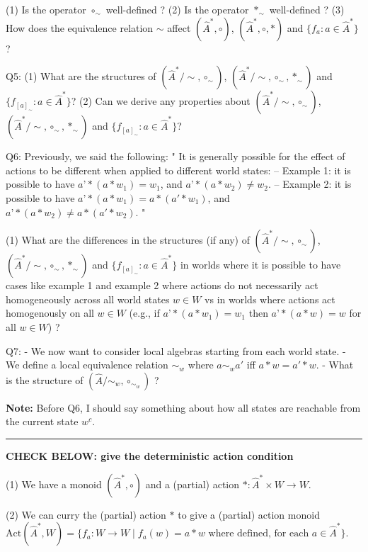 (1) Is the operator $\circ_{\sim}$ well-defined ?
(2) Is the operator $\ast_{\sim}$ well-defined ?
(3) How does the equivalence relation $\sim$ affect $(\hat{A}^{\ast}, \circ)$, $(\hat{A}^{\ast}, \circ, \ast)$ and $\{ f_{a} : a \in \hat{A}^{\ast} \}$ ?

Q5:
(1) What are the structures of $(\hat{A}^{\ast}/\sim, \circ_{\sim})$, $(\hat{A}^{\ast}/\sim, \circ_{\sim}, \ast_{\sim})$ and $\{ f_{[a]_{\sim}} : a \in \hat{A}^{\ast} \}$?
(2) Can we derive any properties about $(\hat{A}^{\ast}/\sim, \circ_{\sim})$, $(\hat{A}^{\ast}/\sim, \circ_{\sim}, \ast_{\sim})$ and $\{ f_{[a]_{\sim}} : a \in \hat{A}^{\ast} \}$?

Q6:
Previously, we said the following:
"
It is generally possible for the effect of actions to be different when applied to different world states:
    -- Example 1: it is possible to have $a’ \ast (a \ast w_{1}) = w_{1}$, and $a’ \ast (a \ast w_{2}) \neq w_{2}$.
    -- Example 2: it is possible to have $a’ \ast (a \ast w_{1}) = a \ast (a' \ast w_{1})$, and $a’ \ast (a \ast w_{2}) \neq a \ast (a' \ast w_{2})$.
"

(1) What are the differences in the structures (if any) of $(\hat{A}^{\ast}/\sim, \circ_{\sim})$, $(\hat{A}^{\ast}/\sim, \circ_{\sim}, \ast_{\sim})$ and $\{ f_{[a]_{\sim}} : a \in \hat{A}^{\ast} \}$ in worlds where it is possible to have cases like example 1 and example 2 where actions do not necessarily act homogeneously across all world states $w \in W$ vs in worlds where actions act homogenously on all $w \in W$ (e.g., if $a’ \ast (a \ast w_{1}) = w_{1}$ then $a’ \ast (a \ast w) = w$ for all $w \in W$) ?

Q7:
- We now want to consider local algebras starting from each world state.
- We define a local equivalence relation $\sim_{w}$ where $a \sim_{w} a'$ iff $a \ast w = a' \ast w$.
- What is the structure of $(\hat{A}/\sim_{w}, \circ_{\sim_{w}})$ ?



\textbf{Note:}
Before Q6, I should say something about how all states are reachable from the current state $w^{c}$.



\noindent\rule{\textwidth}{1mm}
\textbf{CHECK BELOW: give the deterministic action condition}

(1) We have a monoid $(\hat{A}^{\ast}, \circ)$ and a (partial) action $\ast: \hat{A}^{\ast} \times W \to W$.

(2) We can curry the (partial) action $\ast$ to give a (partial) action monoid $\text{Act}(\hat{A}^{\ast}, W) = \{f_{a}: W \to W \mid f_{a}(w) = a \ast w \text{ where defined, for each } a \in \hat{A}^{\ast} \}$.


